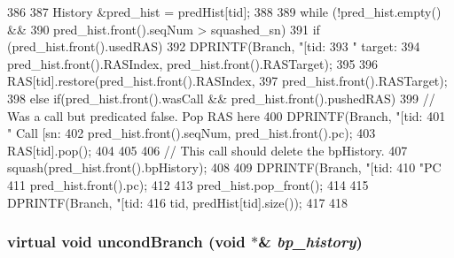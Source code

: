 \begin{DoxyCode}
386 {
387     History &pred_hist = predHist[tid];
388 
389     while (!pred_hist.empty() &&
390            pred_hist.front().seqNum > squashed_sn) {
391         if (pred_hist.front().usedRAS) {
392             DPRINTF(Branch, "[tid:%
393                     " target: %
394                     pred_hist.front().RASIndex, pred_hist.front().RASTarget);
395 
396             RAS[tid].restore(pred_hist.front().RASIndex,
397                              pred_hist.front().RASTarget);
398         } else if(pred_hist.front().wasCall && pred_hist.front().pushedRAS) {
399              // Was a call but predicated false. Pop RAS here
400              DPRINTF(Branch, "[tid: %
401                      "  Call [sn:%
402                      pred_hist.front().seqNum, pred_hist.front().pc);
403              RAS[tid].pop();
404         }
405 
406         // This call should delete the bpHistory.
407         squash(pred_hist.front().bpHistory);
408 
409         DPRINTF(Branch, "[tid:%
410                 "PC %
411                 pred_hist.front().pc);
412 
413         pred_hist.pop_front();
414 
415         DPRINTF(Branch, "[tid:%
416                 tid, predHist[tid].size());
417     }
418 }
\end{DoxyCode}
\hypertarget{classBPredUnit_a17161e0c51444f148e49e4df2ba89704}{
\subsubsection[{uncondBranch}]{\setlength{\rightskip}{0pt plus 5cm}virtual void uncondBranch (void $\ast$\& {\em bp\_\-history})}}
\label{classBPredUnit_a17161e0c51444f148e49e4df2ba89704}


